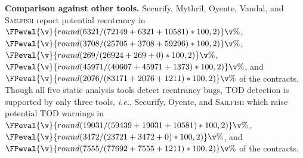 \documentclass[conference, romanappendices]{tex/IEEEtran}
\theoremstyle{bfnote}
\newcommand{\toolname}{\textsc{Sailfish}\xspace}
\newcommand{\oyente}{{\sc Oyente}\xspace}
\newcommand{\securify}{{\sc Securify}\xspace}
\newcommand{\vandal}{{\sc Vandal}\xspace}
\newcommand{\reentrancy}{{reentrancy}\xspace}
\newcommand{\mythril}{{\sc Mythril}\xspace}
\newcommand{\ie}{\textit{i.e.}}
\newcommand{\securifySafeDAO}{72149}
\newcommand{\securifyUnsafeDAO}{6321}
\newcommand{\securifySafeTOD}{59439}
\newcommand{\securifyUnsafeTOD}{19031}
\newcommand{\securifyTimeout}{10581}
\newcommand{\mythrilSafeDAO}{25705}
\newcommand{\mythrilUnsafeDAO}{3708}
\newcommand{\mythrilTimeout}{59296}
\newcommand{\vandalSafeDAO}{40607}
\newcommand{\vandalUnsafeDAO}{45971}
\newcommand{\vandalTimeout}{1373}
\newcommand{\oyenteSafeDAO}{26924}
\newcommand{\oyenteUnsafeDAO}{269}
\newcommand{\oyenteSafeTOD}{23721}
\newcommand{\oyenteUnsafeTOD}{3472}
\newcommand{\oyenteTimeout}{0}
\newcommand{\clintSafeDAO}{83171}
\newcommand{\clintUnsafeDAO}{2076}
\newcommand{\clintSafeTOD}{77692}
\newcommand{\clintUnsafeTOD}{7555}
\newcommand{\clintTimeout}{1211}
\begin{document}
\noindent
\textbf{Comparison against other tools.}
\securify, \mythril, \oyente, \vandal, and \toolname{} report potential \reentrancy in $\FPeval{\v}{round(\securifyUnsafeDAO/(\securifySafeDAO+\securifyUnsafeDAO+\securifyTimeout)*100,2)}\v\%$, $\FPeval{\v}{round(\mythrilUnsafeDAO/(\mythrilSafeDAO+\mythrilUnsafeDAO+\mythrilTimeout)*100,2)}\v\%$, $\FPeval{\v}{round(\oyenteUnsafeDAO/(\oyenteSafeDAO+\oyenteUnsafeDAO+\oyenteTimeout)*100,2)}\v\%$, $\FPeval{\v}{round(\vandalUnsafeDAO/(\vandalSafeDAO+\vandalUnsafeDAO+\vandalTimeout)*100,2)}\v\%$, and $\FPeval{\v}{round(\clintUnsafeDAO/(\clintSafeDAO+\clintUnsafeDAO+\clintTimeout)*100,2)}\v\%$ of the contracts.
Though all five static analysis tools detect \reentrancy bugs, TOD detection is supported by only three tools, \ie, \securify, \oyente, and \toolname which raise potential TOD warnings in $\FPeval{\v}{round(\securifyUnsafeTOD/(\securifySafeTOD+\securifyUnsafeTOD+\securifyTimeout)*100,2)}\v\%$, $\FPeval{\v}{round(\oyenteUnsafeTOD/(\oyenteSafeTOD+\oyenteUnsafeTOD+\oyenteTimeout)*100,2)}\v\%$, and $\FPeval{\v}{round(\clintUnsafeTOD/(\clintSafeTOD+\clintUnsafeTOD+\clintTimeout)*100,2)}\v\%$ of the contracts.
\end{document}
